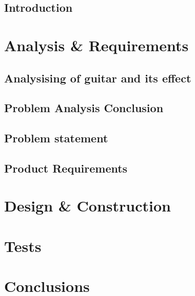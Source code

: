 \glsresetall
 \graphicspath{{figures/analysing/}}
\chapter{Introduction}

\part{Analysis \& Requirements}\label{pt:analysis} \glsresetall
 \graphicspath{{figures/analysing/}}
 \chapter{Analysising of guitar and its effect}\label{ch:analysing}
 
 

\label{sec:platform_comparing}
 \label{sec:FPGA}
 \label{sec:digital_vs_analog}
\chapter{Problem Analysis Conclusion}

\chapter{Problem statement}

\chapter{Product Requirements}








\part{Design \& Construction}\label{pt:design} 

\part{Tests}\label{pt:tests} 
\part{Conclusions}\label{pt:conclusions} 
%

\glsresetall
\appendix %

 \graphicspath{{figures/appendix/}}



